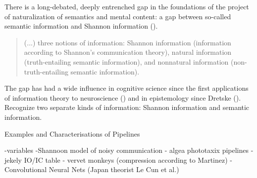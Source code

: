 \documentclass[10pt, aspectratio=169, handout]{beamer}
\begin{document}
\begin{frame}[label=gap_intro]
    There is a long-debated, deeply entrenched gap in the foundations of the project of naturalization of semantics and mental content: a gap between so-called semantic information and Shannon information (\cite{godfrey-smith_biological_2016,piccinini_information_2011}).

     \begin{quote}
        (...) three notions of information: Shannon information (information according to Shannon’s  communication theory), natural information (truth-entailing semantic information), and  nonnatural information (non-truth-entailing semantic information). \cite{piccinini_information_2011}
    \end{quote}

    \medskip 
    
      
    The gap has had a wide influence in cognitive science since the first applications of information theory to neuroscience (\cite{mackay_limiting_1952}) and in epistemology since Dretske (\cite{dretske_knowledge_1981}). Recognize two separate kinds of information: Shannon information and semantic information. 


  

\end{frame}




    \begin{frame}{Examples and Characterisations of Pipelines }

        -variables
        -Shannoon model of noisy communication 
        - algea phototaxix pipelines
        - jekely IO/IC table
        - vervet monkeys (compression according to Martinez)
        - Convolutional Neural Nets (Japan theorist Le Cun et al.)


    \end{frame}
    
\end{document}
